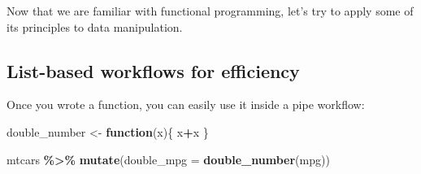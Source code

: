\documentclass[
]{article}
\newenvironment{Shaded}{\begin{snugshade}}{\end{snugshade}}
\newcommand{\ControlFlowTok}[1]{\textcolor[rgb]{0.13,0.29,0.53}{\textbf{#1}}}
\newcommand{\DataTypeTok}[1]{\textcolor[rgb]{0.13,0.29,0.53}{#1}}
\newcommand{\KeywordTok}[1]{\textcolor[rgb]{0.13,0.29,0.53}{\textbf{#1}}}
\newcommand{\NormalTok}[1]{#1}
\newcommand{\OperatorTok}[1]{\textcolor[rgb]{0.81,0.36,0.00}{\textbf{#1}}}
\newcommand{\StringTok}[1]{\textcolor[rgb]{0.31,0.60,0.02}{#1}}
\begin{document}
Now that we are familiar with functional programming, let's try to apply some of its principles
to data manipulation.

\hypertarget{list-based-workflows-for-efficiency}{%
\subsection{List-based workflows for efficiency}\label{list-based-workflows-for-efficiency}}

Once you wrote a function, you can easily use it inside a pipe workflow:

\begin{Shaded}
\begin{Highlighting}[]
\NormalTok{double\_number \textless{}{-}}\StringTok{ }\ControlFlowTok{function}\NormalTok{(x)\{}
\NormalTok{  x}\OperatorTok{+}\NormalTok{x}
\NormalTok{\}}
\end{Highlighting}
\end{Shaded}

\begin{Shaded}
\begin{Highlighting}[]
\NormalTok{mtcars }\OperatorTok{\%\textgreater{}\%}
\StringTok{  }\KeywordTok{mutate}\NormalTok{(}\DataTypeTok{double\_mpg =} \KeywordTok{double\_number}\NormalTok{(mpg))}
\end{Highlighting}
\end{Shaded}
\end{document}
